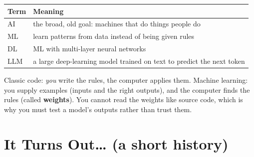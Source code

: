 \begin{center}
\begin{tabularx}{\linewidth}{@{}l X@{}}
\toprule
\textbf{Term} & \textbf{Meaning} \\
\midrule
AI & the broad, old goal: machines that do things people do \\
ML & learn patterns from data instead of being given rules \\
DL & ML with multi-layer neural networks \\
LLM & a large deep-learning model trained on text to predict the next token \\
\bottomrule
\end{tabularx}
\end{center}

\begin{keyidea}
Classic code: \emph{you} write the rules, the computer applies them. Machine learning: you supply
examples (inputs and the right outputs), and the computer finds the rules (called
\textbf{weights}). You cannot read the weights like source code, which is why you must test a
model's outputs rather than trust them.
\end{keyidea}

\section{It Turns Out\dots{} (a short history)}

\begin{center}
\end{center}

